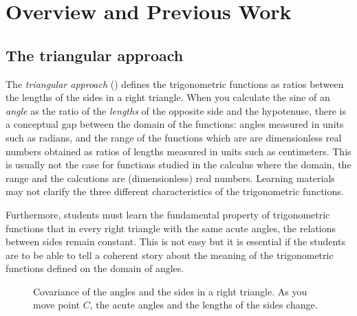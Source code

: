 
\chapter{Overview and Previous Work}

\section{The triangular approach}

The \textit{triangular approach} (\cite{thompson}) defines the trigonometric functions as ratios between the lengths of the sides in a right triangle.
When you calculate the sine of an \emph{angle} as the ratio of the \emph{lengths} of the opposite side and the hypotenuse, there is a conceptual gap between the domain of the functions: angles measured in units such as radians, and the range of the functions which are are dimensionless real numbers obtained as ratios of lengths measured in units such as centimeters. This is usually not the case for functions studied in the calculus where the domain, the range and the calcutions are (dimensionless) real numbers.
Learning materials may not clarify the three different characteristics of the trigonometric functions.

Furthermore, students must learn the fundamental property of trigonometric functions that in every right triangle with the same acute angles, the  relations between sides remain constant. This is not easy but it is essential if the students are to be able to tell a coherent story about the meaning of the trigonometric functions defined on the domain of angles.

\begin{wrapfigure}[17]{r}{.45\textwidth}
\begin{center}
\vspace{-4ex}
\caption{Covariance of the angles and the sides in a right triangle. As you move point $C$, the acute angles and the lengths of the sides change.}\label{fig.covariance}
\end{center}
\end{wrapfigure}

